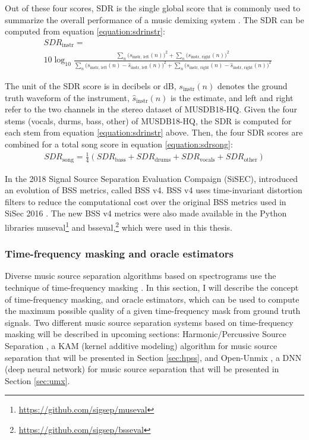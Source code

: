 \documentclass[report.tex]{subfiles}
\begin{document}
Out of these four scores, SDR is the single global score that is commonly used to summarize the overall performance of a music demixing system \parencite{sdruseful}. The SDR can be computed from equation \eqref{equation:sdrinstr}:
\begin{align}
	\nonumber & \mathit{SDR}_{\text{instr}} = \\
	&10 \log_{10}\frac{\sum_{n}\big(s_{\text{instr, left}}(n)\big)^{2} + \sum_{n}\big(s_{\text{instr, right}}(n)\big)^{2}}{\sum_{n}\big(s_{\text{instr, left}}(n) - \hat{s}_{\text{instr, left}}(n)\big)^{2} + \sum_{n}\big(s_{\text{instr, right}}(n) - \hat{s}_{\text{instr, right}}(n)\big)^{2}} \tag{18}\label{equation:sdrinstr}
\end{align}

The unit of the SDR score is in decibels or dB, $s_{\text{instr}}(n)$ denotes the ground truth waveform of the instrument, $\hat{s}_{\text{instr}}(n)$ is the estimate, and left and right refer to the two channels in the stereo dataset of MUSDB18-HQ. Given the four stems (vocals, durms, bass, other) of MUSDB18-HQ, the SDR is computed for each stem from equation \eqref{equation:sdrinstr} above. Then, the four SDR scores are combined for a total song score in equation \eqref{equation:sdrsong}:
\begin{align}
	\mathit{SDR}_{\text{song}} = \frac{1}{4}(\mathit{SDR}_{\text{bass}} + \mathit{SDR}_{\text{drums}} + \mathit{SDR}_{\text{vocals}} + \mathit{SDR}_{\text{other}}) \tag{19}\label{equation:sdrsong}
\end{align}

In the 2018 Signal Source Separation Evaluation Compaign (SiSEC), \textcite{sisec2018} introduced an evolution of BSS metrics, called BSS v4. BSS v4 uses time-invariant distortion filters to reduce the computational cost over the original BSS metrics used in SiSec 2016 \parencite{sisec2016}. The new BSS v4 metrics were also made available in the Python libraries museval\footnote{\url{https://github.com/sigsep/museval}} and bsseval,\footnote{\url{https://github.com/sigsep/bsseval}} which were used in this thesis.

\subsubsection{Time-frequency masking and oracle estimators}
\label{sec:masksandoracles}

Diverse music source separation algorithms based on spectrograms use the technique of time-frequency masking \parencite{musicsepgood, musicmask}. In this section, I will describe the concept of time-frequency masking, and oracle estimators, which can be used to compute the maximum possible quality of a given time-frequency mask from ground truth signals. Two different music source separation systems based on time-frequency masking will be described in upcoming sections: Harmonic/Percussive Source Separation \parencite{fitzgerald1}, a KAM (kernel additive modeling) algorithm for music source separation that will be presented in Section \ref{sec:hpss}, and Open-Unmix \parencite{umx}, a DNN (deep neural network) for music source separation that will be presented in Section \ref{sec:umx}.
\end{document}
